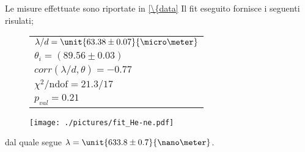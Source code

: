 Le misure effettuate sono riportate in \tablename{ \ref{\{data}} Il fit eseguito fornisce i seguenti risulati;
\begin{figure}[H]
	\begin{minipage}{0.25\textwidth}
		\begin{tabular}{l}
			$\lambda/d = \unit{63.38 \pm 0.07}{\micro\meter}$ \\
			$\theta_i = (89.56 \pm 0.03) $\\
			$corr(\lambda/d,\theta) = -0.77$\\
			$\chi^2 /\text{ndof} = 21.3 / 17 $\\
			$p_{val} = 0.21$
		\end{tabular}
	\end{minipage}
	\begin{minipage}{0.8\textwidth}
		\centering
		\texttt{[image: ./pictures/fit\_He-ne.pdf]}
	\end{minipage}
\end{figure}

dal quale segue $\lambda = \unit{633.8 \pm 0.7}{\nano\meter}$.